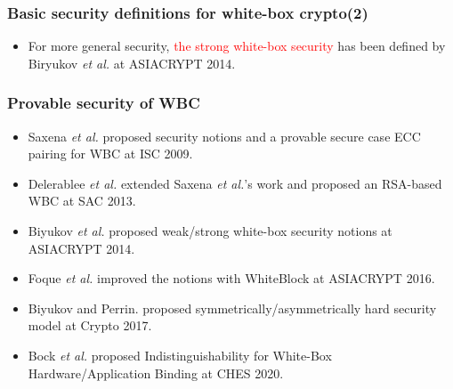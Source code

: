 \documentclass{beamer}
\begin{document}
\frame
{
\frametitle{Basic security definitions for white-box crypto(2)}
\begin{itemize}
\item For more general security, \textcolor{red}{the strong white-box security} has been defined by Biryukov \textit{et al.} at ASIACRYPT 2014.
\end{itemize}

\begin{center}
\end{center}
}

\frame
{
\frametitle{Provable security of WBC}

\begin{itemize}
\item Saxena \textit{et al.} proposed security notions and a provable secure case ECC pairing for WBC at ISC 2009.

\item Delerablee \textit{et al.} extended Saxena \textit{et al.}'s work and proposed an RSA-based WBC at SAC 2013.

\item Biyukov \textit{et al.} proposed weak/strong white-box security notions at ASIACRYPT 2014.

\item Foque \textit{et al.} improved the notions with WhiteBlock at ASIACRYPT 2016.

\item Biyukov and Perrin. proposed symmetrically/asymmetrically hard security model at Crypto 2017.

\item Bock \textit{et al.} proposed Indistinguishability for White-Box Hardware/Application Binding at CHES 2020.

\end{itemize}

}
\end{document}
